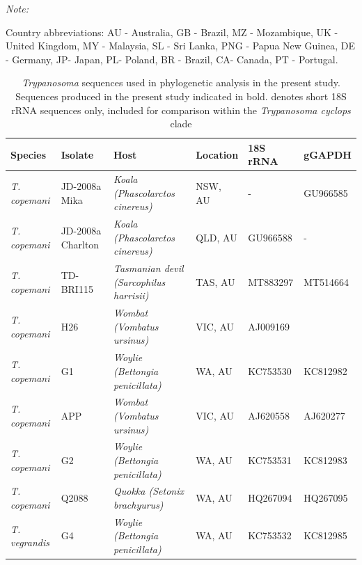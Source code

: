\documentclass[a4paper, nobind]{templates/ociamthesis}
\begin{document}
\begin{landscape}\begingroup\fontsize{8}{10}\selectfont

\begin{ThreePartTable}
\begin{TableNotes}
\item \textit{Note: } 
\item Country abbreviations: AU - Australia, GB - Brazil, MZ - Mozambique, UK - United Kingdom, MY - Malaysia, SL - Sri Lanka, PNG - Papua New Guinea, DE - Germany, JP- Japan, PL- Poland, BR - Brazil, CA- Canada, PT - Portugal.
\end{TableNotes}
\begin{longtabu} to 
\caption[Sequences used for phylogenetic analysis of \textit{Trypanosoma} in Tasmanian devils]{\label{tab:TA61}\textit{Trypanosoma} sequences used in phylogenetic analysis in the present study. Sequences produced in the present study indicated in bold. denotes short 18S rRNA sequences only, included for comparison within the \textit{Trypanosoma cyclops} clade}\\
\toprule
Species & Isolate & Host & Location & 18S rRNA & gGAPDH\\
\midrule
\em{T. copemani} & JD-2008a Mika & \em{Koala (Phascolarctos cinereus)} & NSW, AU & - & GU966585\\
\em{T. copemani} & JD-2008a Charlton & \em{Koala (Phascolarctos cinereus)} & QLD, AU & GU966588 & -\\
\em{T. copemani} & TD-BRI115 & \em{Tasmanian devil (Sarcophilus harrisii)} & TAS, AU & MT883297 & MT514664\\
\em{T. copemani} & H26 & \em{Wombat (Vombatus ursinus)} & VIC, AU & AJ009169 & \\
\em{T. copemani} & G1 & \em{Woylie (Bettongia penicillata)} & WA, AU & KC753530 & KC812982\\
\em{T. copemani} & APP & \em{Wombat (Vombatus ursinus)} & VIC, AU & AJ620558 & AJ620277\\
\em{T. copemani} & G2 & \em{Woylie (Bettongia penicillata)} & WA, AU & KC753531 & KC812983\\
\em{T. copemani} & Q2088 & \em{Quokka (Setonix brachyurus)} & WA, AU & HQ267094 & HQ267095\\
\em{T. vegrandis} & G4 & \em{Woylie (Bettongia penicillata)} & WA, AU & KC753532 & KC812985\\

\end{longtabu}
\end{ThreePartTable}
\end{landscape}
\end{document}
